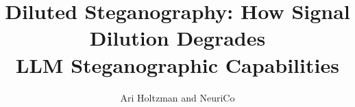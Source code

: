\documentclass{article}
\title{Diluted Steganography: How Signal Dilution Degrades\\LLM Steganographic Capabilities}
\author{Ari Holtzman and NeuriCo}
\begin{document}
\maketitle

\begin{abstract}

\end{abstract}










\end{document}

